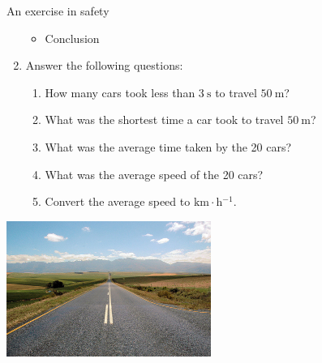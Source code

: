 \begin{Investigation}{An exercise in safety }
\begin{enumerate}[noitemsep, label=\textbf{\arabic*}. ]
\begin{itemize}[noitemsep]
\label{m38791*uid71}\item Conclusion
\end{itemize}
        \label{m38791*uid72}\item Answer the following questions:
\label{m38791*id67432}\begin{enumerate}[noitemsep, label=\textbf{\alph*}. ] 
            \label{m38791*uid73}\item How many cars took less than $3~\text{s}$ to travel $50~\text{m}$?
\label{m38791*uid74}\item What was the shortest time a car took to travel $50~\text{m}$?
\label{m38791*uid75}\item What was the average time taken by the 20 cars?
\label{m38791*uid76}\item What was the average speed of the 20 cars?
\label{m38791*uid77}\item Convert the average speed to $\text{km}\ensuremath{\cdot}\text{h}{}^{-1}$.
\end{enumerate}
        \end{enumerate}
\begin{center}
\includegraphics[width=0.5\textwidth]{photos/roadby_cornstaruk_flickr.jpg}
\end{center}
\end{Investigation}
  \label{m38791**end}
